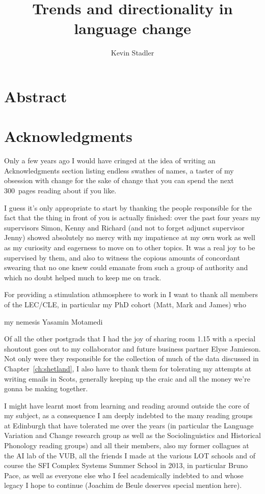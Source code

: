 \documentclass[oneside]{book}
\author{Kevin Stadler}
\title{Trends and directionality in language change}
\begin{document}
\frontmatter

\maketitle

\chapter{Abstract}


\chapter{Acknowledgments}

Only a few years ago I would have cringed at the idea of writing an Acknowledgments section listing endless swathes of names, a taster of my obsession with change for the sake of change that you can spend the next 300~pages reading about if you like.

I guess it's only appropriate to start by thanking the people responsible for the fact that the thing in front of you is actually finished: over the past four years my supervisors Simon, Kenny and Richard (and not to forget adjunct supervisor Jenny) showed absolutely no mercy with my impatience at my own work as well as my curiosity and eagerness to move on to other topics. It was a real joy to be supervised by them, and also to witness the copious amounts of concordant swearing that no one knew could emanate from such a group of authority and which no doubt helped much to keep me on track.

For providing a stimulation athmosphere to work in I want to thank all members of the LEC/CLE, in particular my PhD cohort (Matt, Mark and James) who 

my nemesis Yasamin Motamedi

Of all the other postgrads that I had the joy of sharing room 1.15 with a special shoutout goes out to my collaborator and future business partner Elyse Jamieson. Not only were they responsible for the collection of much of the data discussed in Chapter~\ref{ch:shetland}, I also have to thank them for tolerating my attempts at writing emails in Scots, generally keeping up the craic and all the money we're gonna be making together.

I might have learnt most from learning and reading around outside the core of my subject, as a consequence I am deeply indebted to the many reading groups at Edinburgh that have tolerated me over the years (in particular the Language Variation and Change research group as well as the Sociolinguistics and Historical Phonology reading groups) and all their members, also my former collagues at the AI lab of the VUB, all the friends I made at the various LOT schools and of course the SFI Complex Systems Summer School in 2013, in particular Bruno Pace, as well as everyone else who I feel academically indebted to and whose legacy I hope to continue (Joachim de Beule deserves special mention here).
\end{document}

